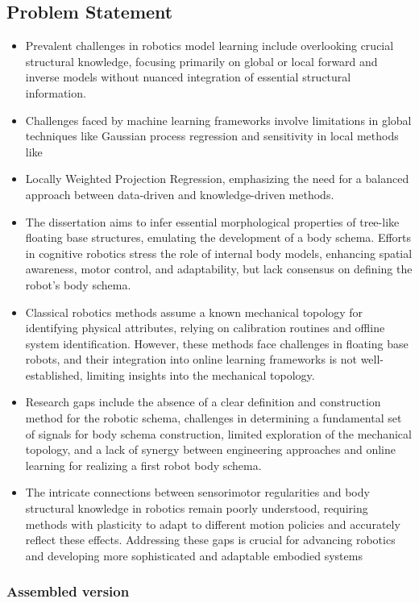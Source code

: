 \documentclass[12pt, a4paper]{article}
\begin{document}
\subsection*{Problem Statement}
\begin{itemize}
	\item Prevalent challenges in robotics model learning include overlooking crucial structural knowledge, focusing primarily on global or local forward and inverse models without nuanced integration of essential structural information.
	\item Challenges faced by machine learning frameworks involve limitations in global techniques like Gaussian process regression and sensitivity in local methods like \item Locally Weighted Projection Regression, emphasizing the need for a balanced approach between data-driven and knowledge-driven methods.
	\item The dissertation aims to infer essential morphological properties of tree-like floating base structures, emulating the development of a body schema. Efforts in cognitive robotics stress the role of internal body models, enhancing spatial awareness, motor control, and adaptability, but lack consensus on defining the robot's body schema.
	\item Classical robotics methods assume a known mechanical topology for identifying physical attributes, relying on calibration routines and offline system identification. However, these methods face challenges in floating base robots, and their integration into online learning frameworks is not well-established, limiting insights into the mechanical topology.
	\item Research gaps include the absence of a clear definition and construction method for the robotic schema, challenges in determining a fundamental set of signals for body schema construction, limited exploration of the mechanical topology, and a lack of synergy between engineering approaches and online learning for realizing a first robot body schema.
	\item The intricate connections between sensorimotor regularities and body structural knowledge in robotics remain poorly understood, requiring methods with plasticity to adapt to different motion policies and accurately reflect these effects. Addressing these gaps is crucial for advancing robotics and developing more sophisticated and adaptable embodied systems
\end{itemize}

\subsubsection*{Assembled version}
\end{document}
